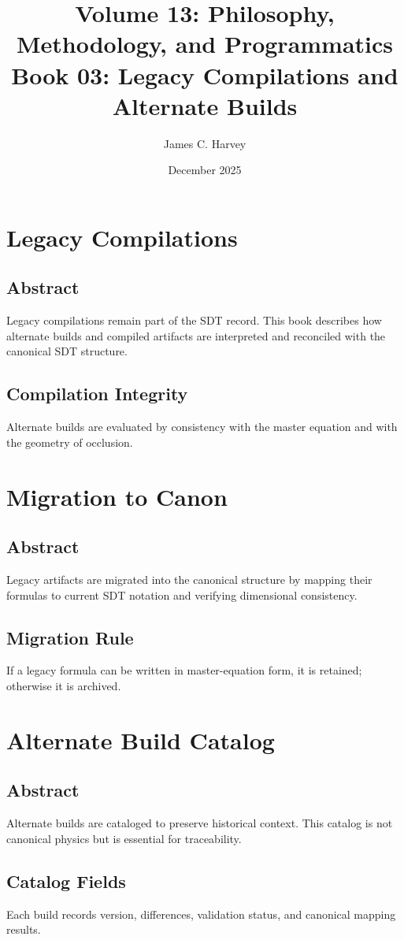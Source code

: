 \documentclass[12pt]{book}
\title{Volume 13: Philosophy, Methodology, and Programmatics \\ Book 03: Legacy Compilations and Alternate Builds}
\author{James C. Harvey}
\date{December 2025}
\begin{document}
\maketitle
\tableofcontents

\chapter{Legacy Compilations}

\section*{Abstract}
Legacy compilations remain part of the SDT record. This book describes how alternate builds and compiled
artifacts are interpreted and reconciled with the canonical SDT structure.

\section{Compilation Integrity}
Alternate builds are evaluated by consistency with the master equation and with the geometry of occlusion.

\chapter{Migration to Canon}

\section*{Abstract}
Legacy artifacts are migrated into the canonical structure by mapping their formulas to current SDT
notation and verifying dimensional consistency.

\section{Migration Rule}
If a legacy formula can be written in master-equation form, it is retained; otherwise it is archived.

\chapter{Alternate Build Catalog}

\section*{Abstract}
Alternate builds are cataloged to preserve historical context. This catalog is not canonical physics but
is essential for traceability.

\section{Catalog Fields}
Each build records version, differences, validation status, and canonical mapping results.
\end{document}
